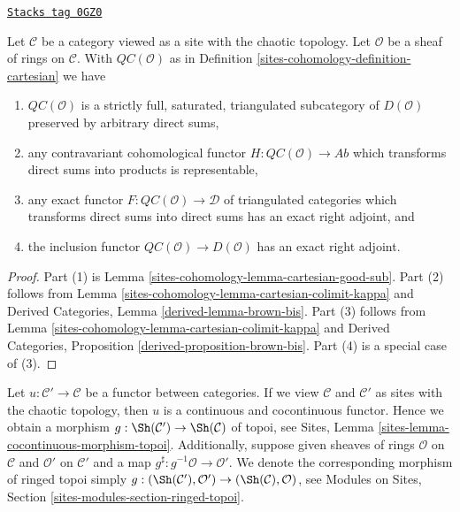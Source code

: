 \begin{proposition}
\label{sites-cohomology-proposition-cartesian-brown}
\href{https://stacks.math.columbia.edu/tag/0GZ0}{\texttt{Stacks tag 0GZ0}}

Let $\mathcal{C}$ be a category viewed as a site with
the chaotic topology. Let $\mathcal{O}$ be a sheaf of rings on $\mathcal{C}$.
With $\mathit{QC}(\mathcal{O})$ as in
Definition \ref{sites-cohomology-definition-cartesian} we have
\begin{enumerate}
\item $\mathit{QC}(\mathcal{O})$ is a strictly full, saturated, triangulated
subcategory of $D(\mathcal{O})$ preserved by arbitrary direct sums,
\item any contravariant cohomological functor
$H : \mathit{QC}(\mathcal{O}) \to \textit{Ab}$
which transforms direct sums into products is representable,
\item any exact functor $F : \mathit{QC}(\mathcal{O}) \to \mathcal{D}$
of triangulated categories which transforms direct sums into direct sums
has an exact right adjoint, and
\item the inclusion functor $\mathit{QC}(\mathcal{O}) \to D(\mathcal{O})$ has
an exact right adjoint.
\end{enumerate}
\end{proposition}

\begin{proof}
Part (1) is Lemma \ref{sites-cohomology-lemma-cartesian-good-sub}.
Part (2) follows from Lemma \ref{sites-cohomology-lemma-cartesian-colimit-kappa} and
Derived Categories, Lemma \ref{derived-lemma-brown-bis}.
Part (3) follows from
Lemma \ref{sites-cohomology-lemma-cartesian-colimit-kappa} and
Derived Categories, Proposition \ref{derived-proposition-brown-bis}.
Part (4) is a special case of (3).
\end{proof}

Let $u : \mathcal{C}' \to \mathcal{C}$ be a functor between categories.
If we view $\mathcal{C}$ and $\mathcal{C}'$ as sites with the chaotic
topology, then $u$ is a continuous and cocontinuous functor. Hence
we obtain a morphism $g : \Sh(\mathcal{C}') \to \Sh(\mathcal{C})$
of topoi, see Sites, Lemma \ref{sites-lemma-cocontinuous-morphism-topoi}.
Additionally, suppose given sheaves of rings $\mathcal{O}$ on $\mathcal{C}$
and $\mathcal{O}'$ on $\mathcal{C}'$ and a map
$g^\sharp : g^{-1}\mathcal{O} \to \mathcal{O}'$.
We denote the corresponding morphism of ringed topoi simply
$g : (\Sh(\mathcal{C}'), \mathcal{O}') \to (\Sh(\mathcal{C}), \mathcal{O})$,
see Modules on Sites, Section \ref{sites-modules-section-ringed-topoi}.

